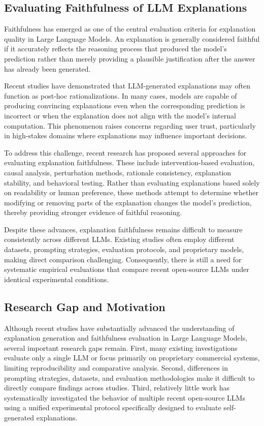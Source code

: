\documentclass{article}
\begin{document}
\subsection{Evaluating Faithfulness of LLM Explanations}

Faithfulness has emerged as one of the central evaluation criteria for explanation quality in Large Language Models. An explanation is generally considered faithful if it accurately reflects the reasoning process that produced the model's prediction rather than merely providing a plausible justification after the answer has already been generated.

Recent studies have demonstrated that LLM-generated explanations may often function as post-hoc rationalizations. In many cases, models are capable of producing convincing explanations even when the corresponding prediction is incorrect or when the explanation does not align with the model's internal computation. This phenomenon raises concerns regarding user trust, particularly in high-stakes domains where explanations may influence important decisions.

To address this challenge, recent research has proposed several approaches for evaluating explanation faithfulness. These include intervention-based evaluation, causal analysis, perturbation methods, rationale consistency, explanation stability, and behavioral testing. Rather than evaluating explanations based solely on readability or human preference, these methods attempt to determine whether modifying or removing parts of the explanation changes the model's prediction, thereby providing stronger evidence of faithful reasoning.

Despite these advances, explanation faithfulness remains difficult to measure consistently across different LLMs. Existing studies often employ different datasets, prompting strategies, evaluation protocols, and proprietary models, making direct comparison challenging. Consequently, there is still a need for systematic empirical evaluations that compare recent open-source LLMs under identical experimental conditions.

\subsection{Research Gap and Motivation}

Although recent studies have substantially advanced the understanding of explanation generation and faithfulness evaluation in Large Language Models, several important research gaps remain. First, many existing investigations evaluate only a single LLM or focus primarily on proprietary commercial systems, limiting reproducibility and comparative analysis. Second, differences in prompting strategies, datasets, and evaluation methodologies make it difficult to directly compare findings across studies. Third, relatively little work has systematically investigated the behavior of multiple recent open-source LLMs using a unified experimental protocol specifically designed to evaluate self-generated explanations.
\end{document}
